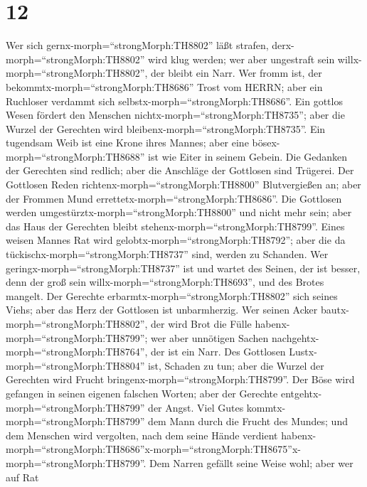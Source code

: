 \hypertarget{section-11}{%
\section{12}\label{section-11}}

 Wer sich gernx-morph=``strongMorph:TH8802'' läßt strafen,
derx-morph=``strongMorph:TH8802'' wird klug werden; wer aber ungestraft
sein willx-morph=``strongMorph:TH8802'', der bleibt ein Narr.
 Wer fromm ist, der bekommtx-morph=``strongMorph:TH8686''
Trost vom HERRN; aber ein Ruchloser verdammt sich
selbstx-morph=``strongMorph:TH8686''.  Ein gottlos Wesen
fördert den Menschen nichtx-morph=``strongMorph:TH8735''; aber die
Wurzel der Gerechten wird bleibenx-morph=``strongMorph:TH8735''.
 Ein tugendsam Weib ist eine Krone ihres Mannes; aber eine
bösex-morph=``strongMorph:TH8688'' ist wie Eiter in seinem Gebein.
 Die Gedanken der Gerechten sind redlich; aber die Anschläge
der Gottlosen sind Trügerei.  Der Gottlosen Reden
richtenx-morph=``strongMorph:TH8800'' Blutvergießen an; aber der Frommen
Mund errettetx-morph=``strongMorph:TH8686''.  Die Gottlosen
werden umgestürztx-morph=``strongMorph:TH8800'' und nicht mehr sein;
aber das Haus der Gerechten bleibt stehenx-morph=``strongMorph:TH8799''.
 Eines weisen Mannes Rat wird
gelobtx-morph=``strongMorph:TH8792''; aber die da
tückischx-morph=``strongMorph:TH8737'' sind, werden zu Schanden.
 Wer geringx-morph=``strongMorph:TH8737'' ist und wartet des
Seinen, der ist besser, denn der groß sein
willx-morph=``strongMorph:TH8693'', und des Brotes mangelt.
 Der Gerechte erbarmtx-morph=``strongMorph:TH8802'' sich
seines Viehs; aber das Herz der Gottlosen ist unbarmherzig.
 Wer seinen Acker bautx-morph=``strongMorph:TH8802'', der
wird Brot die Fülle habenx-morph=``strongMorph:TH8799''; wer aber
unnötigen Sachen nachgehtx-morph=``strongMorph:TH8764'', der ist ein
Narr.  Des Gottlosen Lustx-morph=``strongMorph:TH8804''
ist, Schaden zu tun; aber die Wurzel der Gerechten wird Frucht
bringenx-morph=``strongMorph:TH8799''.  Der Böse wird
gefangen in seinen eigenen falschen Worten; aber der Gerechte
entgehtx-morph=``strongMorph:TH8799'' der Angst.  Viel
Gutes kommtx-morph=``strongMorph:TH8799'' dem Mann durch die Frucht des
Mundes; und dem Menschen wird vergolten, nach dem seine Hände verdient
habenx-morph=``strongMorph:TH8686''\textbar x-morph=``strongMorph:TH8675''x-morph=``strongMorph:TH8799''.
 Dem Narren gefällt seine Weise wohl; aber wer auf Rat
